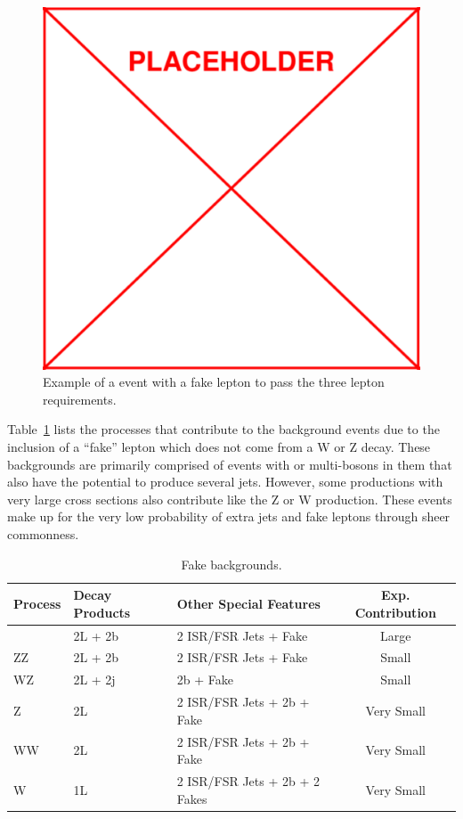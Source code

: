 			\begin{figure}[h]
\begin{center}
\includegraphics[width=0.48\linewidth]{Figs/placeholder.pdf}
\caption{\label{fig:tt_w_fake}
Example of a \ttbar event with a fake lepton to pass the three lepton requirements.
}
\end{center}
\end{figure} 
	


	Table~\ref{tab:fake_bkg} lists the processes that contribute to the background events due to the inclusion of a ``fake'' lepton which does not come from a W or Z decay. These backgrounds are primarily comprised of events with \ttbar or multi-bosons in them that also have the potential to produce several jets. However, some productions with very large cross sections also contribute like the Z or W production. These events make up for the very low probability of extra jets and fake leptons through sheer commonness.
			
	\begin{table}[hbt]
	\begin{center}
	\begin{tabular}{l|ll|c}\hline\hline %
	Process & Decay Products & Other Special Features & Exp. Contribution\\
	\hline
	\ttbar & 2L + 2b & 2 ISR/FSR Jets + Fake & Large\\
	ZZ & 2L + 2b & 2 ISR/FSR Jets + Fake & Small\\
	WZ & 2L + 2j & 2b + Fake & Small\\
	Z & 2L & 2 ISR/FSR Jets + 2b + Fake & Very Small\\
	WW & 2L & 2 ISR/FSR Jets + 2b + Fake & Very Small\\
	W & 1L & 2 ISR/FSR Jets + 2b + 2 Fakes & Very Small\\
	\hline \hline
	\end{tabular}
	\caption{\label{tab:fake_bkg} Fake backgrounds.}
	\end{center}
	\end{table}



